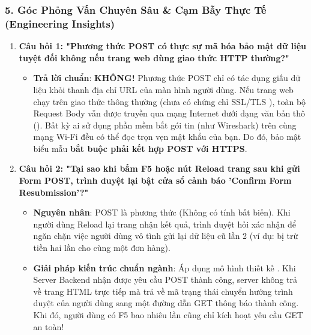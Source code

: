 \subsubsection{5. Góc Phỏng Vấn Chuyên Sâu \& Cạm Bẫy Thực Tế (Engineering Insights)}

\begin{conceptBox}
\begin{enumerate}[leftmargin=1.5em, itemsep=5pt, parsep=0pt]
    \item \textbf{Câu hỏi 1: "Phương thức POST có thực sự mã hóa bảo mật dữ liệu tuyệt đối không nếu trang web dùng giao thức HTTP thường?"}
    \begin{itemize}[leftmargin=1.2em, itemsep=2pt]
        \item \textbf{Trả lời chuẩn}: \textbf{KHÔNG!} Phương thức POST chỉ có tác dụng giấu dữ liệu khỏi thanh địa chỉ URL của màn hình người dùng. Nếu trang web chạy trên giao thức  thông thường (chưa có chứng chỉ SSL/TLS ), toàn bộ Request Body vẫn được truyền qua mạng Internet dưới dạng văn bản thô (). Bất kỳ ai sử dụng phần mềm bắt gói tin (như Wireshark) trên cùng mạng Wi-Fi đều có thể đọc trọn vẹn mật khẩu của bạn. Do đó, bảo mật biểu mẫu \textbf{bắt buộc phải kết hợp POST với HTTPS}.
    \end{itemize}
    \item \textbf{Câu hỏi 2: "Tại sao khi bấm F5 hoặc nút Reload trang sau khi gửi Form POST, trình duyệt lại bật cửa sổ cảnh báo 'Confirm Form Resubmission'?"}
    \begin{itemize}[leftmargin=1.2em, itemsep=2pt]
        \item \textbf{Nguyên nhân}: POST là phương thức  (Không có tính bất biến). Khi người dùng Reload lại trang nhận kết quả, trình duyệt hỏi xác nhận để ngăn chặn việc người dùng vô tình gửi lại dữ liệu cũ lần 2 (ví dụ: bị trừ tiền hai lần cho cùng một đơn hàng).
        \item \textbf{Giải pháp kiến trúc chuẩn ngành}: Áp dụng mô hình thiết kế . Khi Server Backend nhận được yêu cầu POST thành công, server không trả về trang HTML trực tiếp mà trả về mã trạng thái  chuyển hướng trình duyệt của người dùng sang một đường dẫn GET thông báo thành công. Khi đó, người dùng có F5 bao nhiêu lần cũng chỉ kích hoạt yêu cầu GET an toàn!
    \end{itemize}
\end{enumerate}
\end{conceptBox}

